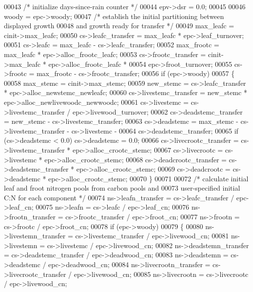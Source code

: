 \begin{DoxyCode}
00043     \textcolor{comment}{/* initialize days-since-rain counter */}
00044     epv->dsr = 0.0;
00045     
00046     woody = epc->woody;
00047     \textcolor{comment}{/* establish the initial partitioning between displayed growth}
00048 \textcolor{comment}{    and growth ready for transfer */}
00049     max\_leafc = cinit->max\_leafc;
00050     cs->leafc\_transfer = max\_leafc * epc->leaf\_turnover;
00051     cs->leafc = max\_leafc - cs->leafc\_transfer;
00052     max\_frootc = max\_leafc * epc->alloc\_frootc\_leafc;
00053     cs->frootc\_transfer = cinit->max\_leafc * epc->alloc\_frootc\_leafc * 
00054         epc->froot\_turnover;
00055     cs->frootc = max\_frootc - cs->frootc\_transfer;
00056     \textcolor{keywordflow}{if} (epc->woody)
00057     \{
00058         max\_stemc = cinit->max\_stemc;
00059         new\_stemc = cs->leafc\_transfer * epc->alloc\_newstemc\_newleafc;
00060         cs->livestemc\_transfer = new\_stemc * epc->alloc\_newlivewoodc\_newwoodc;
00061         cs->livestemc = cs->livestemc\_transfer / epc->livewood\_turnover;
00062         cs->deadstemc\_transfer = new\_stemc - cs->livestemc\_transfer;
00063         cs->deadstemc = max\_stemc - cs->livestemc\_transfer - cs->livestemc - 
00064             cs->deadstemc\_transfer;
00065         \textcolor{keywordflow}{if} (cs->deadstemc < 0.0) cs->deadstemc = 0.0;
00066         cs->livecrootc\_transfer = cs->livestemc\_transfer * epc->alloc\_crootc\_stemc;
00067         cs->livecrootc = cs->livestemc * epc->alloc\_crootc\_stemc;
00068         cs->deadcrootc\_transfer = cs->deadstemc\_transfer * epc->alloc\_crootc\_stemc;
00069         cs->deadcrootc = cs->deadstemc * epc->alloc\_crootc\_stemc;
00070     \} 
00071     
00072     \textcolor{comment}{/* calculate initial leaf and froot nitrogen pools from carbon pools and}
00073 \textcolor{comment}{    user-specified initial C:N for each component */}
00074     ns->leafn\_transfer = cs->leafc\_transfer / epc->leaf\_cn;
00075     ns->leafn = cs->leafc / epc->leaf\_cn;
00076     ns->frootn\_transfer = cs->frootc\_transfer / epc->froot\_cn;
00077     ns->frootn = cs->frootc / epc->froot\_cn;
00078     \textcolor{keywordflow}{if} (epc->woody)
00079     \{
00080         ns->livestemn\_transfer = cs->livestemc\_transfer / epc->livewood\_cn;
00081         ns->livestemn = cs->livestemc / epc->livewood\_cn;
00082         ns->deadstemn\_transfer = cs->deadstemc\_transfer / epc->deadwood\_cn;
00083         ns->deadstemn = cs->deadstemc / epc->deadwood\_cn;
00084         ns->livecrootn\_transfer = cs->livecrootc\_transfer / epc->livewood\_cn;
00085         ns->livecrootn = cs->livecrootc / epc->livewood\_cn;

\end{DoxyCode}
